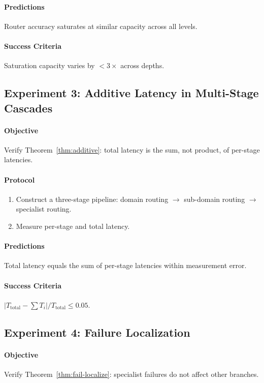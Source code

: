 \documentclass[11pt,a4paper]{article}
\theoremstyle{definition}
\theoremstyle{remark}
\begin{document}
\paragraph{Predictions}
Router accuracy saturates at similar capacity across all levels.

\paragraph{Success Criteria}
Saturation capacity varies by $< 3\times$ across depths.

\subsection{Experiment 3: Additive Latency in Multi-Stage Cascades}

\paragraph{Objective} Verify Theorem~\ref{thm:additive}: total latency is the sum, not product, of per-stage latencies.

\paragraph{Protocol}
\begin{enumerate}
    \item Construct a three-stage pipeline: domain routing $\to$ sub-domain routing $\to$ specialist routing.
    \item Measure per-stage and total latency.
\end{enumerate}

\paragraph{Predictions}
Total latency equals the sum of per-stage latencies within measurement error.

\paragraph{Success Criteria}
$|T_{\text{total}} - \sum T_i| / T_{\text{total}} \leq 0.05$.

\subsection{Experiment 4: Failure Localization}

\paragraph{Objective} Verify Theorem~\ref{thm:fail-localize}: specialist failures do not affect other branches.
\end{document}
